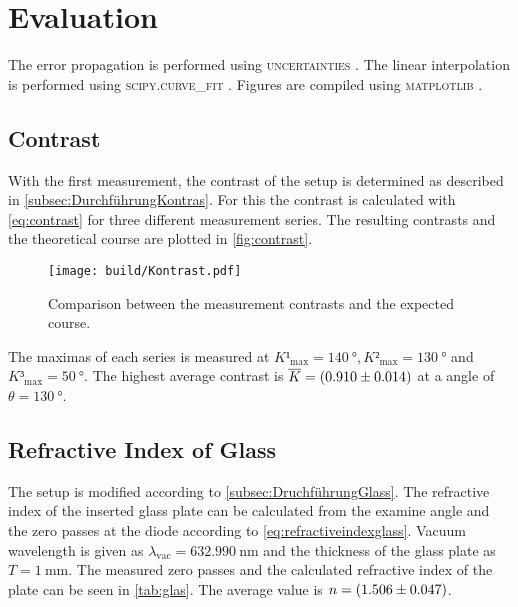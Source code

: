 \section{Evaluation}
\label{sec:auswertung}


The error propagation is performed using  \textsc{uncertainties} \cite{uncertainties}. The linear interpolation is performed using \textsc{scipy.curve\_fit} \cite{scipy}.
Figures are compiled using \textsc{matplotlib} \cite{matplotlib}. 
%

\subsection{Contrast}

With the first measurement, the contrast of the setup is determined as described in \autoref{subsec:DurchführungKontras}.
For this the contrast is calculated with \autoref{eq:contrast} for three different measurement series. 
The resulting contrasts and the theoretical course are plotted in \autoref{fig:contrast}.

\begin{figure}[H]
    \centering
    \texttt{[image: build/Kontrast.pdf]}
    \caption{Comparison between the measurement contrasts and the expected course.}
    \label{fig:contrast}
\end{figure}

The maximas of each series is measured at $K¹_{\text{max}} = \SI{140}{\degree},K²_{\text{max}} = \SI{130}{\degree}$ and $K³_{\text{max}} = \SI{50}{\degree}$.
The highest average contrast is $\overline{K} =  \SI{0.910 \pm 0.014}{}$ at a angle of $\theta = \SI{130}{\degree}$.

\subsection{Refractive Index of Glass}

The setup is modified according to \autoref{subsec:DruchführungGlass}. 
The refractive index of the inserted glass plate can be calculated from the examine angle and the zero passes at the diode according to \eqref{eq:refractiveindexglass}.
Vacuum wavelength is given as $\lambda_\text{vac} = \SI{632.990}{\nano\meter}$ \cite{v64} and the thickness of the glass plate as $T = \SI{1}{\milli\meter}$.
The measured zero passes and the calculated refractive index of the plate can be seen in \autoref{tab:glas}. The average value is $n = \SI{1.506 \pm 0.047}{}$.



